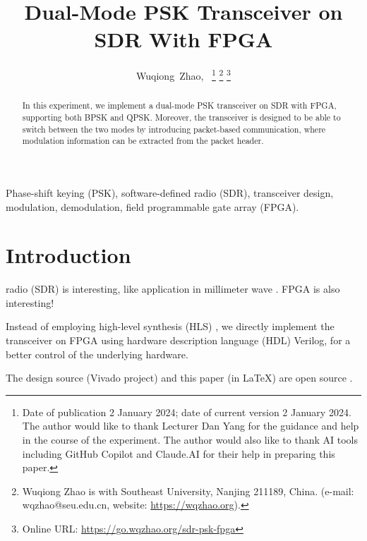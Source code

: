 \documentclass[journal,twoside]{IEEEtran}
\newcommand\orcidicon[1]{\href{https://orcid.org/#1}{\mbox{\scalerel*{
  \begin{tikzpicture}[yscale=-1,transform shape]
    \pic{orcidlogo};
  \end{tikzpicture}
}{|}}}}
\begin{document}
  \title{Dual-Mode PSK Transceiver on SDR With FPGA}

  \author{%
    Wuqiong~Zhao{\hspace{.1em}\textsuperscript{\orcidicon{0000-0002-9550-7423}}},~
    \thanks{Date of publication 2 January 2024; date of current version 2 January 2024.
      The author would like to thank Lecturer Dan Yang for the guidance and help in the course of the experiment.
      The author would also like to thank AI tools including GitHub Copilot and Claude.AI for their help in preparing this paper.}
    \thanks{Wuqiong Zhao is with Southeast University, Nanjing 211189, China. (e-mail: wqzhao@seu.edu.cn, website: \url{https://wqzhao.org}).}
    \thanks{Online URL: \url{https://go.wqzhao.org/sdr-psk-fpga}}
  }

  \maketitle

  \begin{abstract}
    In this experiment, we implement a dual-mode PSK transceiver on SDR with FPGA,
    supporting both BPSK and QPSK.
    Moreover, the transceiver is designed to be able to switch between the two modes by introducing packet-based communication,
    where modulation information can be extracted from the packet header.
  \end{abstract}
  \begin{IEEEkeywords}
    Phase-shift keying (PSK), software-defined radio (SDR), transceiver design, modulation, demodulation, field programmable gate array (FPGA).
  \end{IEEEkeywords}

  \section{Introduction}

     radio (SDR) is interesting, like application in millimeter wave \cite{zhao2020m}.
    FPGA is also interesting!

    Instead of employing high-level synthesis (HLS) \cite{zhao2023flexible},
    we directly implement the transceiver on FPGA using hardware description language (HDL) Verilog,
    for a better control of the underlying hardware.

    The design source (Vivado project) and this paper (in \LaTeX) are open source \cite{github_repo}.
    
\end{document}
